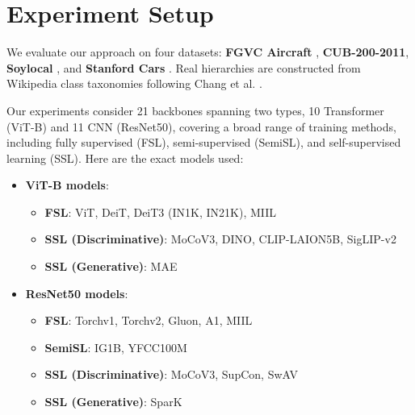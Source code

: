 \documentclass[10pt,twocolumn,letterpaper]{article}
\begin{document}
\section{Experiment Setup}
\label{sec_methodology}
We evaluate our approach on four datasets: \textbf{FGVC Aircraft} \cite{maji_fine-grained_2013}, \textbf{CUB-200-2011}, \textbf{Soylocal} \cite{wah_caltech-ucsd_2011}, and \textbf{Stanford Cars} \cite{krause_collecting_nodate}. Real hierarchies are constructed from Wikipedia class taxonomies following Chang et al. \cite{chang_your_2021}.

Our experiments consider 21 backbones spanning two types, 10 Transformer (ViT-B) and 11 CNN (ResNet50), covering a broad range of training methods, including fully supervised (FSL), semi-supervised (SemiSL), and self-supervised learning (SSL).  
Here are the exact models used:
\begin{itemize} [topsep=3pt, itemsep=2pt, parsep=1pt]
    \item \textbf{ViT-B models}:
    \begin{itemize}[topsep=3pt, itemsep=2pt, parsep=1pt]
        \item \textbf{FSL}: ViT\cite{dosovitskiy_image_2021}, DeiT\cite{touvron_deit_2022}, DeiT3 (IN1K, IN21K)\cite{touvron_deit_2022}, MIIL \cite{ridnik_imagenet-21k_2021}
        \item \textbf{SSL (Discriminative)}: MoCoV3\cite{chen_empirical_2021}, DINO\cite{caron_emerging_2021}, CLIP-LAION5B\cite{cherti_reproducible_2023}, SigLIP-v2\cite{tschannen_siglip_2025}
        \item \textbf{SSL (Generative)}: MAE\cite{he_masked_2021}
    \end{itemize}
    \item \textbf{ResNet50 models}:
    \begin{itemize}[topsep=3pt, itemsep=2pt, parsep=1pt]
        \item \textbf{FSL}: Torchv1\cite{he_deep_2015}, Torchv2\cite{he_deep_2015}, Gluon\cite{he_bag_2018}, A1\cite{wightman_resnet_2021}, MIIL\cite{ridnik_imagenet-21k_2021}
        \item \textbf{SemiSL}: IG1B\cite{yalniz_billion-scale_2019}, YFCC100M\cite{yalniz_billion-scale_2019}
        \item \textbf{SSL (Discriminative)}: MoCoV3\cite{chen_empirical_2021}, SupCon\cite{khosla_supervised_2021}, SwAV\cite{caron_unsupervised_2021}
        \item \textbf{SSL (Generative)}: SparK\cite{tian_designing_2023}
    \end{itemize}
\end{itemize}
\end{document}
